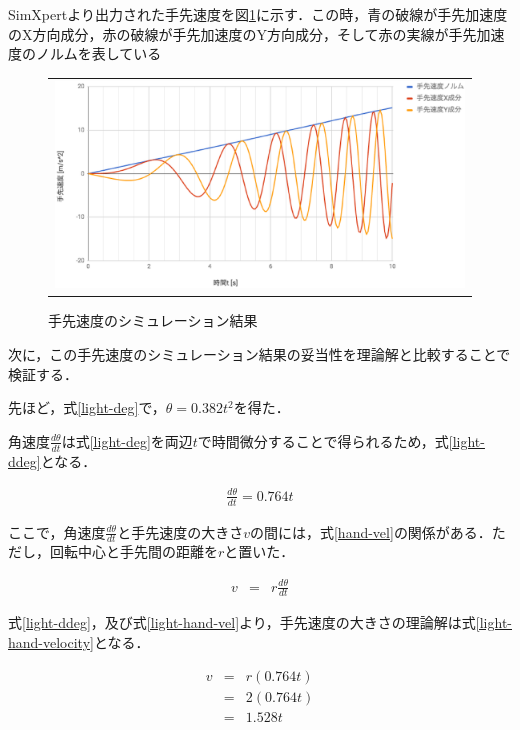 SimXpertより出力された手先速度を図\ref{light-tesaki-sokudo}に示す．この時，青の破線が手先加速度のX方向成分，赤の破線が手先加速度のY方向成分，そして赤の実線が手先加速度のノルムを表している

\begin{figure}[htbp]
  \begin{center}
    \begin{tabular}{c}
      \includegraphics[height=5.5cm]{img/eps/light-tesaki-sokudo2.eps}
    \end{tabular}
    \caption{手先速度のシミュレーション結果}
    \label{light-tesaki-sokudo}
  \end{center}
\end{figure}

次に，この手先速度のシミュレーション結果の妥当性を理論解と比較することで検証する．

先ほど，式\ref{light-deg}で，\(\theta = 0.382t^2\)を得た．

角速度\(\frac{d\theta}{dt}\)は式\ref{light-deg}を両辺\(t\)で時間微分することで得られるため，式\ref{light-ddeg}となる．

\begin{eqnarray}
  \frac{d\theta}{dt} = 0.764t
  \label{light-ddeg}
\end{eqnarray}

ここで，角速度\(\frac{d\theta}{dt}\)と手先速度の大きさ\(v\)の間には，式\ref{hand-vel}の関係がある．ただし，回転中心と手先間の距離を\(r\)と置いた．

\begin{eqnarray}
  v &=& r\frac{d\theta}{dt}
  \label{light-hand-vel}
\end{eqnarray}

式\ref{light-ddeg}，及び式\ref{light-hand-vel}より，手先速度の大きさの理論解は式\ref{light-hand-velocity}となる．

\begin{eqnarray}
  v &=& r(0.764t) \nonumber \\
    &=& 2(0.764t) \nonumber \\
    &=& 1.528t
  \label{light-hand-velocity}
\end{eqnarray}

